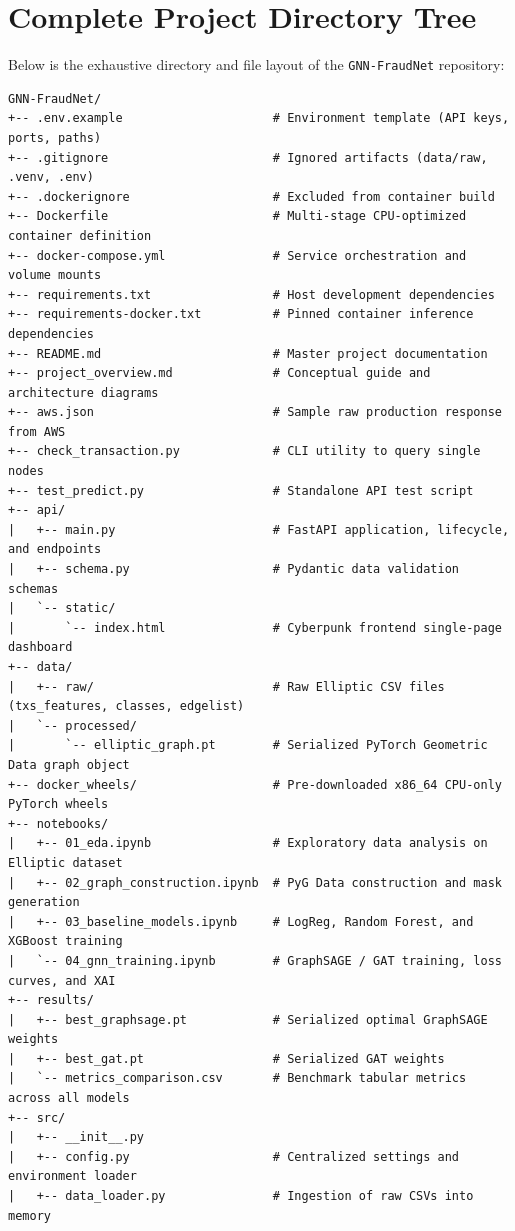 \documentclass[11pt,a4paper]{report}
\begin{document}
\section{Complete Project Directory Tree}
Below is the exhaustive directory and file layout of the \texttt{GNN-FraudNet} repository:
\begin{lstlisting}
GNN-FraudNet/
+-- .env.example                     # Environment template (API keys, ports, paths)
+-- .gitignore                       # Ignored artifacts (data/raw, .venv, .env)
+-- .dockerignore                    # Excluded from container build
+-- Dockerfile                       # Multi-stage CPU-optimized container definition
+-- docker-compose.yml               # Service orchestration and volume mounts
+-- requirements.txt                 # Host development dependencies
+-- requirements-docker.txt          # Pinned container inference dependencies
+-- README.md                        # Master project documentation
+-- project_overview.md              # Conceptual guide and architecture diagrams
+-- aws.json                         # Sample raw production response from AWS
+-- check_transaction.py             # CLI utility to query single nodes
+-- test_predict.py                  # Standalone API test script
+-- api/
|   +-- main.py                      # FastAPI application, lifecycle, and endpoints
|   +-- schema.py                    # Pydantic data validation schemas
|   `-- static/
|       `-- index.html               # Cyberpunk frontend single-page dashboard
+-- data/
|   +-- raw/                         # Raw Elliptic CSV files (txs_features, classes, edgelist)
|   `-- processed/
|       `-- elliptic_graph.pt        # Serialized PyTorch Geometric Data graph object
+-- docker_wheels/                   # Pre-downloaded x86_64 CPU-only PyTorch wheels
+-- notebooks/
|   +-- 01_eda.ipynb                 # Exploratory data analysis on Elliptic dataset
|   +-- 02_graph_construction.ipynb  # PyG Data construction and mask generation
|   +-- 03_baseline_models.ipynb     # LogReg, Random Forest, and XGBoost training
|   `-- 04_gnn_training.ipynb        # GraphSAGE / GAT training, loss curves, and XAI
+-- results/
|   +-- best_graphsage.pt            # Serialized optimal GraphSAGE weights
|   +-- best_gat.pt                  # Serialized GAT weights
|   `-- metrics_comparison.csv       # Benchmark tabular metrics across all models
+-- src/
|   +-- __init__.py
|   +-- config.py                    # Centralized settings and environment loader
|   +-- data_loader.py               # Ingestion of raw CSVs into memory

\end{lstlisting}
\end{document}
